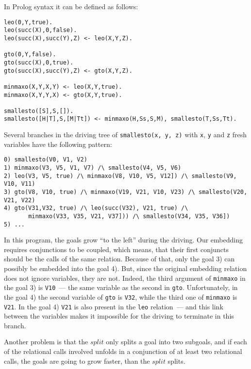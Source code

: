 \documentclass{llncs}
\begin{document}
In Prolog syntax it can be defined as follows: 

\begin{verbatim}
leo(0,Y,true).
leo(succ(X),0,false).
leo(succ(X),succ(Y),Z) <- leo(X,Y,Z).

gto(0,Y,false).
gto(succ(X),0,true).
gto(succ(X),succ(Y),Z) <- gto(X,Y,Z).

minmaxo(X,Y,X,Y) <- leo(X,Y,true).
minmaxo(X,Y,Y,X) <- gto(X,Y,true).

smallesto([S],S,[]).
smallesto([H|T],S,[M|Tt]) <- minmaxo(H,Ss,S,M), smallesto(T,Ss,Tt).
\end{verbatim}

Several branches in the driving tree of \verb!smallesto(x, y, z)! with \verb!x!, \verb!y! and 
\verb!z! fresh variables have the following pattern: 

\begin{verbatim}
0) smallesto(V0, V1, V2)
1) minmaxo(V3, V5, V1, V7) /\ smallesto(V4, V5, V6)
2) leo(V3, V5, true) /\ minmaxo(V8, V10, V5, V12]) /\ smallesto(V9, V10, V11)
3) gto(V8, V10, true) /\ minmaxo(V19, V21, V10, V23) /\ smallesto(V20, V21, V22)
4) gto(V31,V32, true) /\ leo(succ(V32), V21, true) /\ 
       minmaxo(V33, V35, V21, V37])) /\ smallesto(V34, V35, V36])
5) ... 
\end{verbatim}

In this program, the goals grow ``to the left'' during the driving. Our embedding requires conjunctions to be coupled, which means, that their first conjuncts should be the calls of the same relation. Because of that, only the goal 3) can possibly be embedded into the goal 4). But, since the original embedding relation does not ignore variables, they are not. Indeed, the third argument of \verb!minmaxo! in the goal 3) is \verb!V10!~--- the same variable as the second in \verb!gto!. Unfortunately, in the goal 4) the second variable of \verb!gto! is \verb!V32!, while the third one of \verb!minmaxo! is \verb!V21!. In the goal 4) \verb!V21! is also present in the \verb!leo! relation~--- and this link between the variables makes it impossible for the driving to terminate in this branch.


Another problem is that the $split$ only splits a goal into two subgoals, and if each of the relational calls involved unfolds in a conjunction of at least two relational calls, the goals are going to grow faster, than the $split$ splits. 
\end{document}
